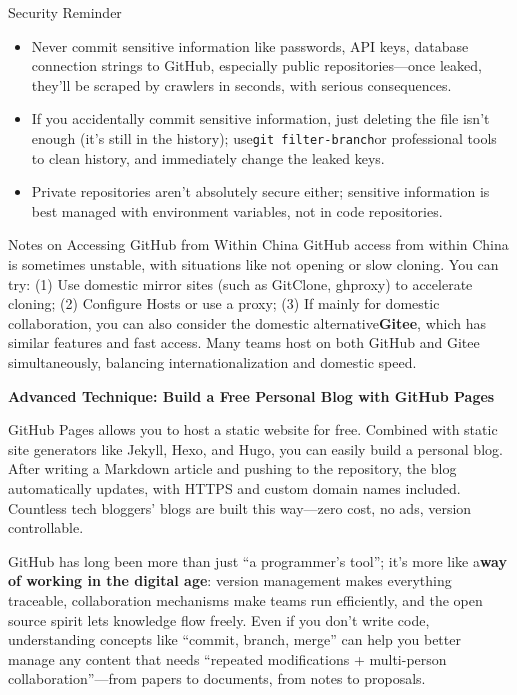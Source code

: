 \begin{tcbwarn}{Security Reminder}
\begin{itemize}
  \item Never commit sensitive information like passwords, API keys, database connection strings to GitHub, especially public repositories—once leaked, they'll be scraped by crawlers in seconds, with serious consequences.
  \item If you accidentally commit sensitive information, just deleting the file isn't enough (it's still in the history); use\texttt{git filter-\allowbreak branch}or professional tools to clean history, and immediately change the leaked keys.
  \item Private repositories aren't absolutely secure either; sensitive information is best managed with environment variables, not in code repositories.
\end{itemize}

\end{tcbwarn}

\begin{tcbinfo}{Notes on Accessing GitHub from Within China}
GitHub access from within China is sometimes unstable, with situations like not opening or slow cloning. You can try: (1) Use domestic mirror sites (such as GitClone, ghproxy) to accelerate cloning; (2) Configure Hosts or use a proxy; (3) If mainly for domestic collaboration, you can also consider the domestic alternative\textbf{Gitee}, which has similar features and fast access. Many teams host on both GitHub and Gitee simultaneously, balancing internationalization and domestic speed.

\end{tcbinfo}

\textbf{Advanced Technique: Build a Free Personal Blog with GitHub Pages}\par

GitHub Pages allows you to host a static website for free. Combined with static site generators like Jekyll, Hexo, and Hugo, you can easily build a personal blog. After writing a Markdown article and pushing to the repository, the blog automatically updates, with HTTPS and custom domain names included. Countless tech bloggers' blogs are built this way—zero cost, no ads, version controllable.


GitHub has long been more than just “a programmer's tool”; it's more like a\textbf{way of working in the digital age}: version management makes everything traceable, collaboration mechanisms make teams run efficiently, and the open source spirit lets knowledge flow freely. Even if you don't write code, understanding concepts like “commit, branch, merge” can help you better manage any content that needs “repeated modifications + multi-person collaboration”—from papers to documents, from notes to proposals.

